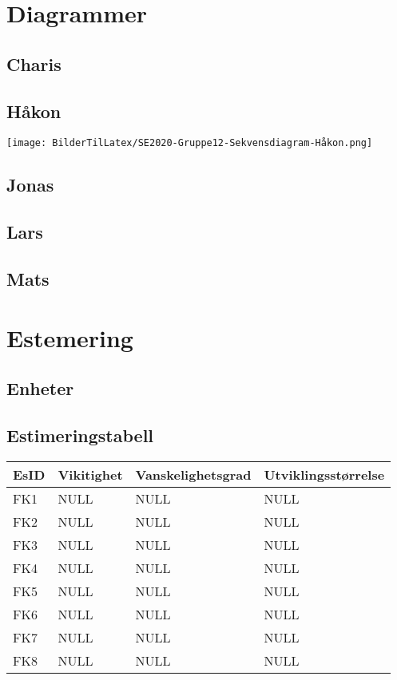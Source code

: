 \documentclass[12pt]{article}
\begin{document}
\section{Diagrammer}

    \subsection{Charis}

    \newpage
    \subsection{Håkon}

    \texttt{[image: BilderTilLatex/SE2020-Gruppe12-Sekvensdiagram-Håkon.png]}


    \subsection{Jonas}

    \subsection{Lars}

    \subsection{Mats}

\section{Estemering}

    \subsection{Enheter}

    \subsection{Estimeringstabell}
        \begin{tabular}{|p{2cm}|p{4cm}|p{4cm}|p{4cm}| } 
            \hline
            \bf EsID & \bf Vikitighet & \bf Vanskelighetsgrad & \bf Utviklingsstørrelse\\
            \hline
            FK1 & NULL & NULL & NULL\\
            \hline
            FK2 & NULL & NULL & NULL\\
            \hline
            FK3 & NULL & NULL & NULL\\
            \hline
            FK4 & NULL & NULL & NULL\\
            \hline
            FK5 & NULL & NULL & NULL\\
            \hline
            FK6 & NULL & NULL & NULL\\
            \hline
            FK7 & NULL & NULL & NULL\\
            \hline
            FK8 & NULL & NULL & NULL\\
            \hline
        \end{tabular}
\end{document}
